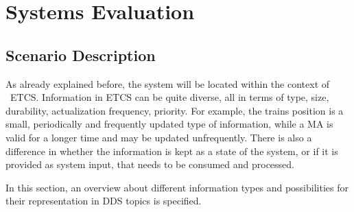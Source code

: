 \chapter{Systems Evaluation}
\label{chptr:evaluation}




\section{Scenario Description}

As already explained before, the system will be located within the context of ~\gls*{ETCS}.
Information in \gls*{ETCS} can be quite diverse, all in terms of type, size, durability, actualization frequency, priority.
For example, the trains position is a small, periodically and frequently updated type of information, while a \gls*{MA} is valid for a longer time and may be updated unfrequently.
There is also a difference in whether the information is kept as a state of the system, or if it is provided as system input, that needs to be consumed and processed.

In this section, an overview about different information types and possibilities for their representation in \gls*{DDS} topics is specified.

